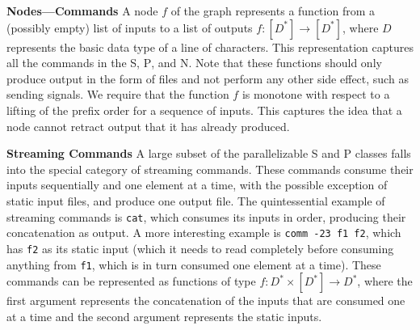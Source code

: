 \documentclass[sigplan, review, screen, anonymous]{acmart}
\newcommand{\heading}[1]{\vspace{4pt}\noindent\textbf{#1}\enspace}
\newcommand{\ttt}[1]{\texttt{#1}}
\newcommand{\cn}[1]{\mbox{\textcircled{\footnotesize #1}}}
\newcommand{\tcn}[1]{\mbox{\textcircled{\scriptsize #1}}}
\newcommand{\sta}{\cn{\textsc{S}}\xspace}
\newcommand{\pur}{\cn{\textsc{P}}\xspace}
\newcommand{\tsta}{\tcn{\textsc{S}}\xspace}
\newcommand{\tpur}{\tcn{\textsc{P}}\xspace}
\newcommand{\tnpu}{\tcn{\textsc{N}}\xspace}
\newcommand{\nv}[1]{[{\color{cyan}nv: #1}]}
\newcommand{\kk}[1]{[{\color{magenta}kk: #1}]}
\newcommand{\km}[1]{[{\color{blue}km: #1}]}
\newcommand{\kstar}{^{\textstyle *}}
\begin{document}
\heading{Nodes---Commands}
A node $f$ of the graph represents a function from a (possibly empty)
list of inputs
to a list of outputs
$f : [D\kstar] \to [D\kstar]$, where $D$ represents the basic data
type of a line of characters.
This representation captures all the commands in
the \tsta, \tpur, and \tnpu. Note that these functions should only produce
output in the form of files and not perform any other side effect,
such as sending signals.  We require that the function $f$ is monotone
with respect to a lifting of the prefix order for a sequence of inputs.
This captures the idea that a node cannot retract output that it has
already produced.

\heading{Streaming Commands}
%
A large subset of the parallelizable \tsta and \tpur classes falls
into the special category of streaming commands. These commands
consume their inputs sequentially and one element at a time, with the
possible exception of static input files, and produce one output
file. The quintessential example of streaming commands is \ttt{cat},
which consumes its inputs in order, producing their concatenation as
output. A more interesting example is \ttt{comm -23 f1 f2}, which has
\ttt{f2} as its static input (which it needs to read completely before
consuming anything from \ttt{f1}, which is in turn consumed one
element at a time). These commands can be represented as functions of
type $f : D\kstar \times [D\kstar] \to D\kstar$, where the first
argument represents the concatenation of the inputs that are consumed
one at a time and the second argument represents the static inputs.
\end{document}
